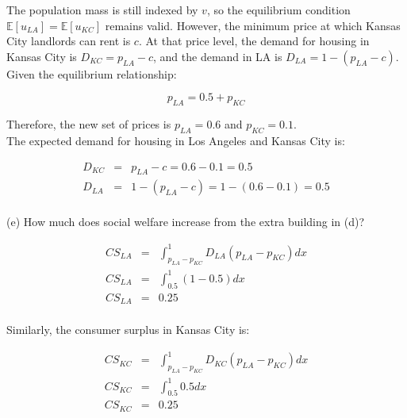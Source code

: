 The population mass is still indexed by \( v \), so the equilibrium condition \( \mathbb{E}[u_{LA}] = \mathbb{E}[u_{KC}] \) remains valid. However, the minimum price at which Kansas City landlords can rent is \( c \). At that price level, the demand for housing in Kansas City is \( D_{KC} = p_{LA} - c \), and the demand in LA is \( D_{LA} = 1 - (p_{LA} - c). \)\\

Given the equilibrium relationship: 

    \begin{equation*}
    p_{LA} = 0.5 + p_{KC}
\end{equation*}

\begin{myanswerbox}
    
    Therefore, the new set of prices is \( p_{LA} = 0.6 \) and \( p_{KC} = 0.1 \).\\

    The expected demand for housing in Los Angeles and Kansas City is:

    \begin{eqnarray*}
        D_{KC} &=& p_{LA} - c = 0.6 - 0.1 = 0.5\\
        D_{LA} &=& 1 - (p_{LA} - c) = 1 - (0.6 - 0.1) = 0.5\\
    \end{eqnarray*}

\end{myanswerbox}


\begin{tcolorbox}
    (e) How much does social welfare increase from the extra building in (d)?
\end{tcolorbox}

\begin{eqnarray*}
    CS_{LA} &=& \int_{p_{LA} - p_{KC}}^{1}  D_{LA}(p_{LA} - p_{KC}) dx\\
    CS_{LA} &=& \int_{0.5}^{1}  (1 - 0.5)dx\\
    CS_{LA} &=& 0.25\\
\end{eqnarray*}

Similarly, the consumer surplus in Kansas City is:

\begin{eqnarray*}
    CS_{KC} &=& \int_{p_{LA} - p_{KC}}^{1}  D_{KC}(p_{LA} - p_{KC}) dx\\
    CS_{KC} &=& \int_{0.5}^{1}  0.5dx\\
    CS_{KC} &=& 0.25\\
\end{eqnarray*}

